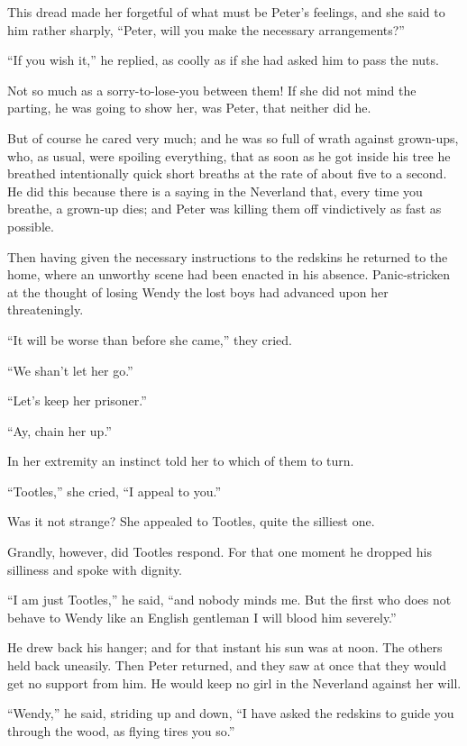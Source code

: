 This dread made her forgetful of what must be Peter's feelings, and she
said to him rather sharply, ``Peter, will you make the necessary
arrangements?''

``If you wish it,'' he replied, as coolly as if she had asked him to pass
the nuts.

Not so much as a sorry-to-lose-you between them! If she did not mind
the parting, he was going to show her, was Peter, that neither did he.

But of course he cared very much; and he was so full of wrath against
grown-ups, who, as usual, were spoiling everything, that as soon as he
got inside his tree he breathed intentionally quick short breaths at
the rate of about five to a second. He did this because there is a
saying in the Neverland that, every time you breathe, a grown-up dies;
and Peter was killing them off vindictively as fast as possible.

Then having given the necessary instructions to the redskins he
returned to the home, where an unworthy scene had been enacted in his
absence. Panic-stricken at the thought of losing Wendy the lost boys
had advanced upon her threateningly.

``It will be worse than before she came,'' they cried.

``We shan't let her go.''

``Let's keep her prisoner.''

``Ay, chain her up.''

In her extremity an instinct told her to which of them to turn.

``Tootles,'' she cried, ``I appeal to you.''

Was it not strange? She appealed to Tootles, quite the silliest one.

Grandly, however, did Tootles respond. For that one moment he dropped
his silliness and spoke with dignity.

``I am just Tootles,'' he said, ``and nobody minds me. But the first who
does not behave to Wendy like an English gentleman I will blood him
severely.''

He drew back his hanger; and for that instant his sun was at noon. The
others held back uneasily. Then Peter returned, and they saw at once
that they would get no support from him. He would keep no girl in the
Neverland against her will.

``Wendy,'' he said, striding up and down, ``I have asked the redskins to
guide you through the wood, as flying tires you so.''


